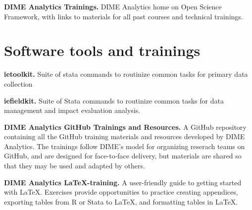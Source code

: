 \resourcepar\textbf{DIME Analytics Trainings.}
DIME Analytics home on Open Science Framework, with links to materials for all past courses and technical trainings. 


\section{Software tools and trainings}

\textbf{ietoolkit.}
Suite of stata commands to routinize common tasks for primary data collection

\resourcepar\textbf{iefieldkit.}
Suite of Stata commands to routinize common tasks for data management and impact evaluation analysis. 

\resourcepar\textbf{DIME Analytics GitHub Trainings and Resources.}
A GitHub repository containing all the GitHub training materials and resources developed by DIME Analytics. The trainings follow DIME's model for organizing reserach teams on GitHub, and are designed for face-to-face delivery, but materials are shared so that they may be used and adapted by others. 

\resourcepar\textbf{DIME Analytics \LaTeX-training.}
A user-friendly guide to getting started with LaTeX. Exercises provide opportunities to practice creating appendices, exporting tables from R or Stata to LaTeX, and formatting tables in LaTeX. 


\mainmatter
